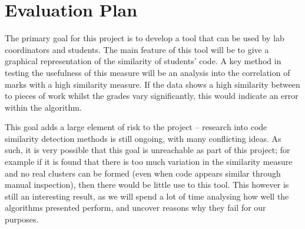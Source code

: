 
\chapter{Evaluation Plan} %

\label{EvaluationPlan} %


The primary goal for this project is to develop a tool that can be used by lab
coordinators and students. The main feature of this tool will be to give a
graphical representation of the similarity of students' code. A key method in
testing the usefulness of this measure will be an analysis into the correlation
of marks with a high similarity measure. If the data shows a high similarity
between to pieces of work whilst the grades vary significantly, this would indicate
an error within the algorithm. 

This goal adds a large element of risk to the project -- research into code
similarity detection methods is still ongoing, with many conflicting ideas. As
such, it is very possible that this goal is unreachable as part of this project;
for example if it is found that there is too much variation in the similarity
measure and no real clusters can be formed (even when code appears similar through
manual inspection), then there would be little use to this tool. This however is
still an interesting result, as we will spend a lot of time analysing how well
the algorithms presented perform, and uncover reasons why they fail for our
purposes.
